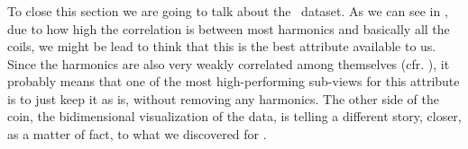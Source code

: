 \subsubsection{\phin}
To close this section we are going to talk about the \phin\ dataset. As we can see in
, due to how high the correlation is between most harmonics and basically
all the coils, we might be lead to think that this is the best attribute available to us. Since the
harmonics are also very weakly correlated among themselves (cfr. ), it probably
means that one of the most high-performing sub-views for this attribute is to just keep it as is,
without removing any harmonics. The other side of the coin, the bidimensional visualization of the
data, is telling a different story, closer, as a matter of fact, to what we discovered for \bn.

